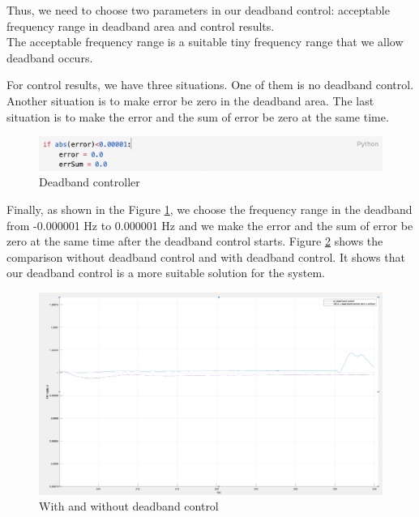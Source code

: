 \documentclass{report}
\begin{document}
Thus, we need to choose two parameters in our deadband control: acceptable frequency range in deadband area and control results.\\

The acceptable frequency range is a suitable tiny frequency range that we allow deadband occurs. 

For control results, we have three situations. One of them is no deadband control. Another situation is to make error be zero in the deadband area. The last situation is to make the error and the sum of error be zero at the same time. \\

\begin{figure}[htbp]
\centering
\includegraphics[width = .999\textwidth]{figure/3_3_deadband_code.png}
\caption{Deadband controller}
\label{3_3_deadband_code}
\end{figure}

Finally, as shown in the Figure \textcolor{red}{\ref{3_3_deadband_code}}, we choose the frequency range in the deadband from -0.000001 Hz to 0.000001 Hz and we make the error and the sum of error be zero at the same time after the deadband control starts. Figure \textcolor{red}{\ref{3_3_deadband_result}} shows the comparison without deadband control and with deadband control. It shows that our deadband control is a more suitable solution for the system.\\

\begin{figure}[htbp]
\centering
\includegraphics[width = .999\textwidth]{figure/3_3_deadband_result.png}
\caption{With and without deadband control}
\label{3_3_deadband_result}
\end{figure}
\end{document}
